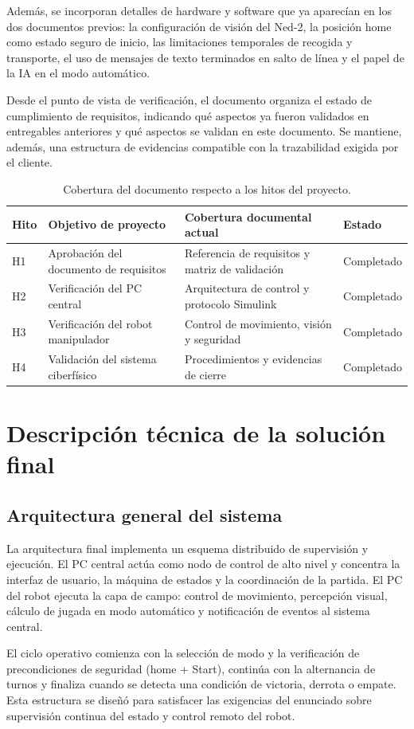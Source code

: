\documentclass[12pt,a4paper]{article}
\begin{document}
Adem\'as, se incorporan detalles de hardware y software que ya aparec\'ian en los dos documentos previos: la configuraci\'on de visi\'on del Ned-2, la posici\'on home como estado seguro de inicio, las limitaciones temporales de recogida y transporte, el uso de mensajes de texto terminados en salto de l\'inea y el papel de la IA en el modo autom\'atico.
\par
Desde el punto de vista de verificaci\'on, el documento organiza el estado de cumplimiento de requisitos, indicando qu\'e aspectos ya fueron validados en entregables anteriores y qu\'e aspectos se validan en este documento. Se mantiene, adem\'as, una estructura de evidencias compatible con la trazabilidad exigida por el cliente.

\begin{table}[H]
\centering
\footnotesize
\begin{tabular}{P{0.18\textwidth} P{0.26\textwidth} P{0.26\textwidth} P{0.20\textwidth}}
\toprule
\textbf{Hito} & \textbf{Objetivo de proyecto} & \textbf{Cobertura documental actual} & \textbf{Estado} \\
\midrule
H1 & Aprobaci\'on del documento de requisitos & Referencia de requisitos y matriz de validaci\'on & Completado \\
H2 & Verificaci\'on del PC central & Arquitectura de control y protocolo Simulink & Completado \\
H3 & Verificaci\'on del robot manipulador & Control de movimiento, visi\'on y seguridad & Completado \\
H4 & Validaci\'on del sistema ciberf\'isico & Procedimientos y evidencias de cierre & Completado \\
\bottomrule
\end{tabular}
\caption{Cobertura del documento respecto a los hitos del proyecto.}
\end{table}

\section{Descripci\'on t\'ecnica de la soluci\'on final}

\subsection{Arquitectura general del sistema}
La arquitectura final implementa un esquema distribuido de supervisi\'on y ejecuci\'on. El PC central act\'ua como nodo de control de alto nivel y concentra la interfaz de usuario, la m\'aquina de estados y la coordinaci\'on de la partida. El PC del robot ejecuta la capa de campo: control de movimiento, percepci\'on visual, c\'alculo de jugada en modo autom\'atico y notificaci\'on de eventos al sistema central.
\par
El ciclo operativo comienza con la selecci\'on de modo y la verificaci\'on de precondiciones de seguridad (home + Start), contin\'ua con la alternancia de turnos y finaliza cuando se detecta una condici\'on de victoria, derrota o empate. Esta estructura se dise\~n\'o para satisfacer las exigencias del enunciado sobre supervisi\'on continua del estado y control remoto del robot.
\end{document}
